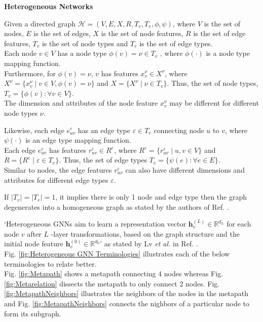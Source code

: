 \documentclass{report} %
\begin{document}
\textbf{Heterogeneous Networks}

Given a directed graph $\mathcal{H} = (V, E, X, R, T_v, T_e, \phi, \psi)$, 
where $V$ is the set of nodes, $E$  is the set of edges, $X$ is the set of node features, $R$ is the set of edge features, $T_v$ is the set of node types and 
$T_e$ is the set of edge types.\\

Each node $v \in V $ has a node type $\phi(v) = \nu \in T_v$ , where $\phi(\cdot)$ is a node type mapping function.\\
Furthermore, for $\phi(v) = \nu$, $v$ has features $x_v^{\nu} \in X^{\nu}$, 
where $X^{\nu} = \{ x_v^{\nu} \mid v \in V, \phi(v) = \nu \}$ and $X = \{ X^{\nu} \mid \nu \in T_v \}$. 
Thus, the set of node types, $T_v = \{ \phi(v) : \forall v \in V \}$.\\
The dimension and attributes of the node feature $x_v^{\nu}$ may be different for different node types $\nu$. 

Likewise, each edge $e_{uv}^{\varepsilon}$ has an edge type $\varepsilon \in T_e$ connecting node $u$ to $v$, where $\psi(\cdot)$ is an edge type mapping function. \\
Each edge $e_{uv}^{\varepsilon}$ has features $r_{uv}^{\varepsilon} \in R^{\varepsilon}$, 
where $R^{\varepsilon} = \{ r_{uv}^{\varepsilon} \mid u, v \in V \}$ and $R = \{ R^{\varepsilon} \mid \varepsilon \in T_e \}$. 
Thus, the set of edge types $T_e = \{ \psi(e) : \forall e \in E \}$. \\
Similar to nodes, the edge features $r_{uv}^{\varepsilon}$ can also have different dimensions and attributes for different edge types $\varepsilon$. 

If $|T_v| = |T_e| = 1$, it implies there is only 1 node and edge type then the graph degenerates into a homogeneous graph as stated by the authors of Ref. \cite{SE HGNN-2023}.

`Heterogeneous \ac{GNN}s aim to learn a representation vector $\mathbf{h}^{(L)}_v \in \mathbb{R}^{d_L}$ for each node $v$ after $L$ -layer transformations, 
based on the graph structure and the initial node feature $\mathbf{h}^{(0)}_v \in \mathbb{R}^{d_0}$'  as stated by  Lv \textit{et al.} in Ref. \cite{REF HGNN-2021}.\\

Fig. \ref{fig:Heterogeneous GNN Terminologies} illustrates each of the below terminologies to relate better.  \\
Fig. \ref{fig:Metapath} shows a metapath connecting 4 nodes whereas Fig. \ref{fig:Metarelation} dissects the metapath to only connect 2 nodes.
Fig. \ref{fig:MetapathNeighbors} illustrates the neighbors of the nodes in the metapath and Fig. \ref{fig:MetapathNeighbors} connects the nighbors of a particular node 
to form its subgraph. \\
\end{document}
